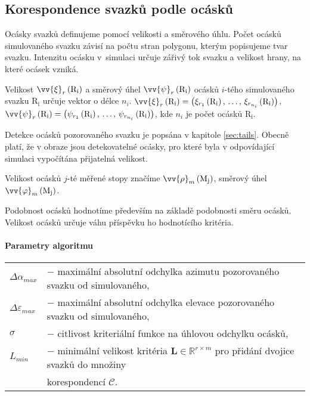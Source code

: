 \newpage
\subsection{Korespondence svazků podle ocásků}
\label{sec: korespondence_ocasky}
		
	Ocásky svazků definujeme pomocí velikosti a směrového úhlu.	Počet ocásků simulovaného svazku závisí na počtu stran polygonu, kterým popisujeme tvar svazku. Intenzitu ocásku v~simulaci určuje zářivý tok svazku a velikost hrany, na které ocásek vzniká. 
	
	Velikost $\vv{\xi}_{r}\left(\mathrm{R_i}\right)$ a směrový úhel $\vv{\psi}_{r}\left(\mathrm{R_i}\right)$ ocásků  $i$-tého simulovaného svazku $\mathrm{R_i}$ určuje vektor o délce $n_i$. $\vv{\xi}_{r}\left(\mathrm{R_i}\right) = \left(\xi_{r_1}\left(\mathrm{R_i}\right),\,\dots,\,\xi_{r_{n_i}}\left(\mathrm{R_i}\right)\right)$, $\vv{\psi}_{r}\left(\mathrm{R_i}\right) = \left(\psi_{r_1}\left(\mathrm{R_i}\right),\,\dots,\,\psi_{r_{n_i}}\left(\mathrm{R_i}\right)\right)$, kde $n_i$ je počet ocásků $\mathrm{R_i}$. 
	
	Detekce ocásků pozorovaného svazku je popsána v kapitole \ref{sec:tails}. Obecně platí, že v obraze jsou detekovatelné ocásky, pro které byla v odpovídající simulaci vypočítána přijatelná velikost. 
	
	Velikost ocásků $j$-té měřené stopy značíme $\vv{\rho}_{m}\left(\mathrm{M_j}\right)$, směrový úhel $\vv{\varphi}_{m}\left(\mathrm{M_j}\right)$. 
	 
	 Podobnost ocásků hodnotíme především na základě podobnosti směru ocásků. Velikost ocásků určuje váhu  příspěvku ho hodnotícího kritéria.
	 
\paragraph{Parametry algoritmu}
\hspace{1mm}
	 
	 \begin{tabular}{l L{13.5cm}}
	 $\Delta\alpha_{max}$ & $-$ maximální absolutní odchylka azimutu pozorovaného svazku od simulovaného,\\
	 $\Delta\varepsilon_{max}$ & $-$ maximální absolutní odchylka elevace pozorovaného svazku od simulovaného,\\
	 $\sigma$ & $-$ citlivost kriteriální funkce na úhlovou odchylku ocásků,\\
	 $L_{min}$ &  $-$ minimální velikost kritéria  $\mathbf{L} \in \mathbb{R}^{r\times m}$ pro přidání dvojice svazků do množiny\\ &korespondencí $\mathcal{C}$. \\
	 \end{tabular}
	
